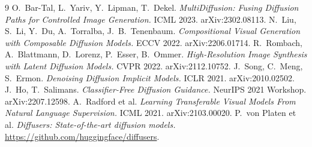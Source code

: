 \documentclass[10pt,a4paper,twocolumn]{article}
\begin{document}
\begin{thebibliography}{9}\footnotesize
\setlength{\itemsep}{1pt}
 O.~Bar-Tal, L.~Yariv, Y.~Lipman, T.~Dekel.
\emph{MultiDiffusion: Fusing Diffusion Paths for Controlled Image Generation.} ICML 2023. arXiv:2302.08113.
 N.~Liu, S.~Li, Y.~Du, A.~Torralba, J.~B.~Tenenbaum.
\emph{Compositional Visual Generation with Composable Diffusion Models.} ECCV 2022. arXiv:2206.01714.
 R.~Rombach, A.~Blattmann, D.~Lorenz, P.~Esser, B.~Ommer.
\emph{High-Resolution Image Synthesis with Latent Diffusion Models.} CVPR 2022. arXiv:2112.10752.
 J.~Song, C.~Meng, S.~Ermon. \emph{Denoising Diffusion Implicit Models.} ICLR 2021. arXiv:2010.02502.
 J.~Ho, T.~Salimans. \emph{Classifier-Free Diffusion Guidance.} NeurIPS 2021 Workshop. arXiv:2207.12598.
 A.~Radford et al. \emph{Learning Transferable Visual Models From Natural Language Supervision.} ICML 2021. arXiv:2103.00020.
 P.~von Platen et al. \emph{Diffusers: State-of-the-art diffusion models.} \url{https://github.com/huggingface/diffusers}.
\end{thebibliography}
\end{document}
